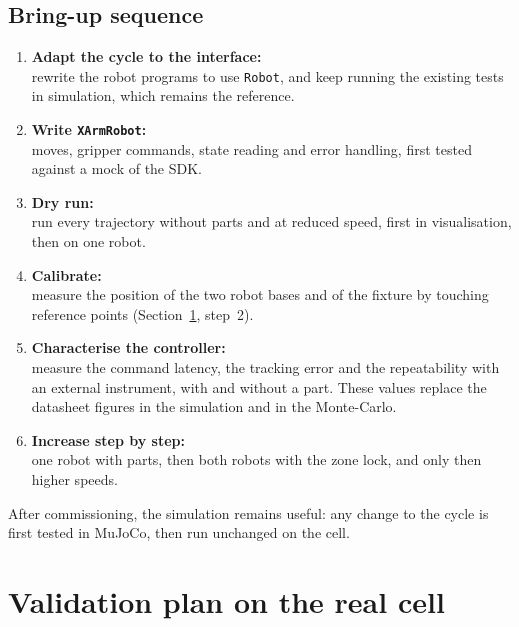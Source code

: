 \documentclass[11pt,a4paper]{article}
\newcommand{\code}[1]{\texttt{#1}}
\begin{document}
\subsection{Bring-up sequence}

\begin{enumerate}
  \item \textbf{Adapt the cycle to the interface:}\\ rewrite the robot programs to use
        \code{Robot}, and keep running the existing tests in simulation, which remains the
        reference.
  \item \textbf{Write \code{XArmRobot}:}\\ moves, gripper commands, state reading and error
        handling, first tested against a mock of the SDK.
  \item \textbf{Dry run:}\\ run every trajectory without parts and at reduced speed, first in
        visualisation, then on one robot.
  \item \textbf{Calibrate:}\\ measure the position of the two robot bases and of the fixture by
        touching reference points (Section~\ref{sec:valid}, step~2).
  \item \textbf{Characterise the controller:}\\ measure the command latency, the tracking error and
        the repeatability with an external instrument, with and without a part. These values
        replace the datasheet figures in the simulation and in the Monte-Carlo.
  \item \textbf{Increase step by step:}\\ one robot with parts, then both robots with the zone lock,
        and only then higher speeds.
\end{enumerate}

After commissioning, the simulation remains useful: any change to the cycle is first tested in
MuJoCo, then run unchanged on the cell.

\section{Validation plan on the real cell}
\label{sec:valid}
\end{document}
